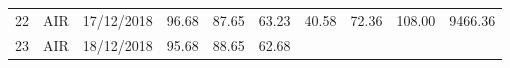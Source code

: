 \documentclass[
  11pt,
]{article}
\begin{document}
\begin{longtable}[]{@{}llllllllll@{}}
\begin{minipage}[t]{0.04\columnwidth}\raggedright
22\strut
\end{minipage} & \begin{minipage}[t]{0.09\columnwidth}\raggedright
AIR\strut
\end{minipage} & \begin{minipage}[t]{0.10\columnwidth}\raggedright
17/12/2018\strut
\end{minipage} & \begin{minipage}[t]{0.06\columnwidth}\raggedright
96.68\strut
\end{minipage} & \begin{minipage}[t]{0.06\columnwidth}\raggedright
87.65\strut
\end{minipage} & \begin{minipage}[t]{0.06\columnwidth}\raggedright
63.23\strut
\end{minipage} & \begin{minipage}[t]{0.06\columnwidth}\raggedright
40.58\strut
\end{minipage} & \begin{minipage}[t]{0.06\columnwidth}\raggedright
72.36\strut
\end{minipage} & \begin{minipage}[t]{0.13\columnwidth}\raggedright
108.00\strut
\end{minipage} & \begin{minipage}[t]{0.08\columnwidth}\raggedright
9466.36\strut
\end{minipage}\tabularnewline
\begin{minipage}[t]{0.04\columnwidth}\raggedright
23\strut
\end{minipage} & \begin{minipage}[t]{0.09\columnwidth}\raggedright
AIR\strut
\end{minipage} & \begin{minipage}[t]{0.10\columnwidth}\raggedright
18/12/2018\strut
\end{minipage} & \begin{minipage}[t]{0.06\columnwidth}\raggedright
95.68\strut
\end{minipage} & \begin{minipage}[t]{0.06\columnwidth}\raggedright
88.65\strut
\end{minipage} & \begin{minipage}[t]{0.06\columnwidth}\raggedright
62.68\strut
\end{minipage} & \begin{minipage}[t]{0.06\columnwidth}\raggedright

\end{minipage}
\end{longtable}
\end{document}
